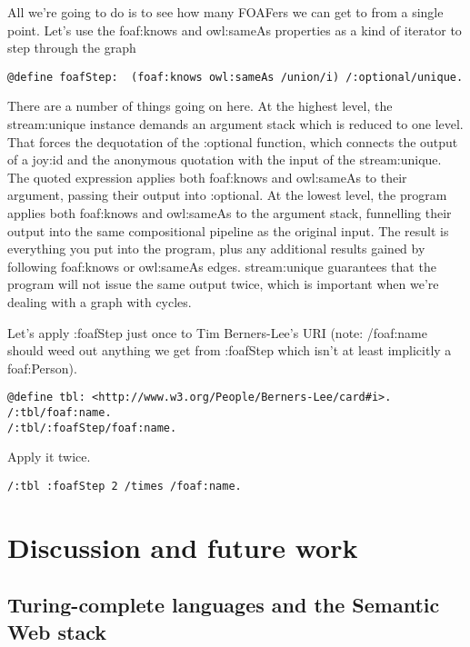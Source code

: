\documentclass[runningheads]{llncs}
\begin{document}
All we're going to do is to see how many FOAFers we can get to from a single point.  Let's use the foaf:knows and owl:sameAs properties as a kind of iterator to step through the graph

\begin{verbatim}
@define foafStep:  (foaf:knows owl:sameAs /union/i) /:optional/unique.
\end{verbatim}

There are a number of things going on here.  At the highest level, the stream:unique instance demands an argument stack which is reduced to one level.  That forces the dequotation of the :optional function, which connects
the output of a joy:id and the anonymous quotation with the input of the stream:unique.  The quoted expression applies both foaf:knows and owl:sameAs to their argument, passing their output into :optional.  At the lowest level, the program
applies both foaf:knows and owl:sameAs to the argument stack, funnelling their output into the same compositional
pipeline as the original input.  The result is everything you put into the program, plus any additional results gained by following foaf:knows or owl:sameAs edges.  stream:unique guarantees that the program will not issue the same output twice, which is important when we're dealing with a graph with cycles.

Let's apply :foafStep just once to Tim Berners-Lee's URI (note: /foaf:name should weed out anything we get from :foafStep which isn't at least implicitly a foaf:Person).

\begin{verbatim}
@define tbl: <http://www.w3.org/People/Berners-Lee/card#i>.
/:tbl/foaf:name.
/:tbl/:foafStep/foaf:name.
\end{verbatim}

Apply it twice.

\begin{verbatim}
/:tbl :foafStep 2 /times /foaf:name.
\end{verbatim}




\section{Discussion and future work}

\subsection{Turing-complete languages and the Semantic Web stack}
\end{document}
